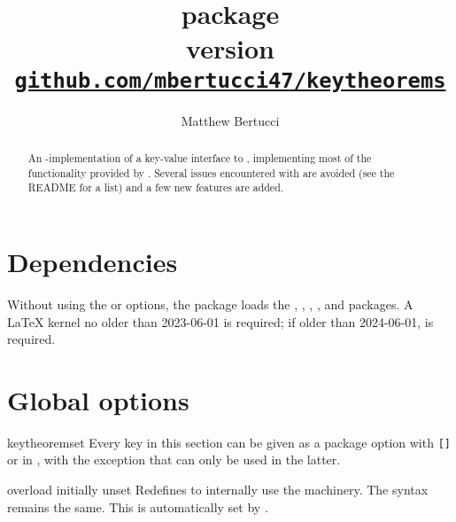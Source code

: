 \documentclass{ltxdoc}
\title{%
  \pkg{keytheorems} package \\[1ex]
  \large version \version \\[1ex]
  \href{https://github.com/mbertucci47/keytheorems}
    {\texttt{github.com/mbertucci47/keytheorems}}
  }
\author{Matthew Bertucci}
\newcommand{\bracks}[1]{\texttt{[#1]}}
\newcommand{\ttbraces}[1]{\braces{\texttt{#1}}}
\begin{document}
\maketitle

\begin{abstract}
An -implementation of a key-value interface to , implementing most of the functionality provided by .
Several issues encountered with  are avoided (see the README for a list) and a few new features are added.
\end{abstract}

\tableofcontents

\section{Dependencies}

Without using the  or  options, the package loads the , , , , and  packages.
A \LaTeX{} kernel no older than 2023-06-01 is required; if older than 2024-06-01,  is required.
    
\section{Global options}

\begin{docCommand}{keytheoremset}
  {}
Every key in this section can be given as a package option with \bracks{}\ttbraces{keytheorems} or in , with the exception that  can only be used in the latter.
\end{docCommand}

\begin{docKey}{overload}
  {}
  {initially unset}
Redefines  to internally use the  machinery. The syntax remains the same.
This is automatically set by .
\end{docKey}
\end{document}
